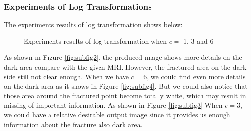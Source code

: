 \subsubsection{Experiments of Log Transformations}
The experiments results of log transformation shows below:
\begin{figure}[h]
	\centering
	\caption{Experiments results of log transformation when $c=$ 1, 3 and 6}
	\label{fig:exlogfig}	
\end{figure}
As shown in Figure \ref{fig:subfig2}, the produced image shows more details on the dark area compare with the given MRI. However, the fractured area on the dark side still not clear enough. When we have $c=6$, we could find even more details on the dark area as it shows in Figure \ref{fig:subfig4}. But we could also notice that those area around the fractured point become totally white, which may result in missing of important information. As shown in Figure \ref{fig:subfig3} When $c=3$, we could have a relative desirable output image since it provides us enough information about the fracture also dark area. \par
